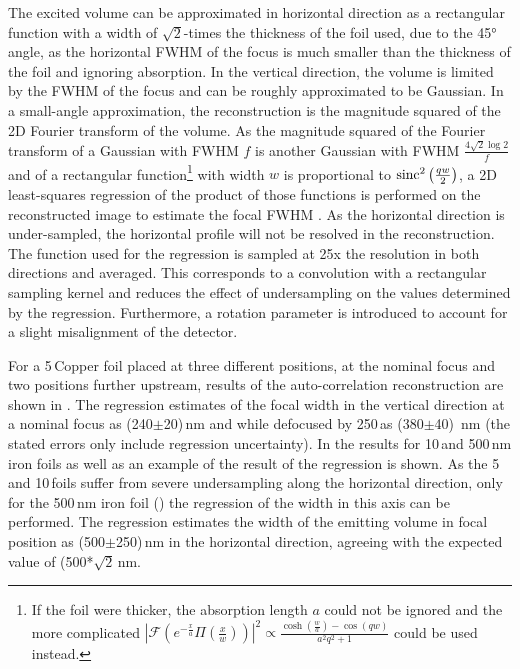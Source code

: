 The excited volume can be approximated in horizontal direction as a rectangular function with a width of $\sqrt{2}$-times the thickness of the foil used, due to the 45° angle, as the horizontal FWHM of the focus is much smaller than the thickness of the foil and ignoring absorption.  In the vertical direction, the volume is limited by the FWHM of the focus and can be roughly approximated to be Gaussian. 
In a small-angle approximation, the reconstruction is the magnitude squared of the 2D Fourier transform of the volume. As the magnitude squared of the Fourier transform of a Gaussian with FWHM $f$ is another Gaussian with FWHM $\frac{4\sqrt{2}\log{2}}{f}$ and of a rectangular function\footnote{If the foil were thicker, the absorption length $a$ could not be ignored and the more complicated $\left|\mathscr{F}\left(e^{-\frac{x}{a}} \Pi \left(\frac{x}{w}\right)\right)\right|^2 \propto \frac{\cosh \left(\frac{w}{a}\right)-\cos (q w)}{a^2 q^2+1}$
	could be used instead.} with width $w$ is proportional to $\operatorname{sinc}^2{\left(\frac{q w}{2}\right)}$, a 2D least-squares regression of the product of those functions is performed on the reconstructed image to estimate the focal FWHM \cite{butz2015}. As the horizontal direction is under-sampled, the horizontal profile will not be resolved in the reconstruction.  The function used for the regression is sampled at 25x the resolution in both directions and averaged. This corresponds to a convolution with a rectangular sampling kernel and reduces the effect of undersampling on the values determined by the regression. Furthermore, a rotation parameter is introduced to account for a slight misalignment of the detector.

For a 5\,\micrometer Copper foil placed at three different positions, at the nominal focus and two positions further upstream, results of the auto-correlation reconstruction are shown in .
The regression estimates of the focal width in the vertical direction at a nominal focus as (240$\pm$20)\,nm and while defocused by 250\,\micrometer as (380$\pm$40)\, nm (the stated errors only include regression uncertainty). In  the results for 10\,\micrometer and 500\,nm iron foils as well as an example of the result of the regression is shown. As the 5\,\micrometer and 10\,\micrometer foils suffer from severe undersampling along the horizontal direction, only for the 500\,nm iron foil () the regression of the width in this axis can be performed. The regression estimates the width of the emitting volume in focal position as (500$\pm$250)\,nm in the horizontal direction, agreeing with the expected value of (500*$\sqrt{2}$\,nm.

